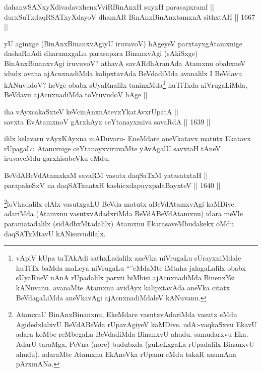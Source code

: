 \begin{shl}
dahanwSANxyXdivadavxhenxVviRBinAnxH suyxH parasapxramf || \\
durxSuTxdaqRSATxyXdayoV dhamAR BinAnxBinAnxtamxnA sithxtAH ||  1667 ||  
\end{shl}


\begin{artha}
yU aginxge (BinAnxBinanxvAgiyU iruvavoV) hAgeyeV parxtayxgAtamxnige dashaRnAdi dharamxgaLu parasapxra BinanxvAgi (sAkiSxge) BinAnxBinanxvAgi iruvuvoV? athavA savARdhAranAda Atamxnu obabxneV idudx avana ajAcnxnadiMda kalipxtavAda BeVdadiMda avanalilx I BeVdavu kANuvudoV? heVge obabx sUyaRnalilx taninxMda\footnote{vApiV kUpa taTAkAdi sathxLadalilx aneVka niVrugaLu sUrayxniMdale huTiTx baMda maLeya niVrugaLu ``\stext''eMdaMte iMtaha jalagaLalilx obabx sUyaRneV nAnA rUpadalilx parxti biMbisi ajAcnxnadiMda BinenxYsi kANuvanu. avanaMte Atamxnu avidAyx kalipxtavAda aneVka citatx BeVdagaLiMda aneVkavAgi ajAcnxnadiMdaleV kANuvanu.} huTiTxda niVrugaLiMda, BeVdavu ajAcnxnadiMda toVruvudoV hAge ||
\end{artha}


\begin{shl}
iha vAyxcakaSxteV keVcinAnxnAtevxYkatAvxrUpatA || \\
savxta EvA\s \s tamxnoV gArxhAyx ceYtanayxmiva savaRdA ||  1639 ||  
\end{shl}

\begin{artha}
ililx kelavaru vAyxKAyxna mADuvaru- EneMdare aneVkatavx matutx Ekatavx rUpagaLu Atamxnige ceYtanayxviruvaMte yAvAgalU savxtaH tAneV iruvaveMdu garxhisabeVku eMdu.
\end{artha}


\begin{shl}
BeVdABeVdAtamxkaM savaRM vasutx daqSaTxM yatasatxtaH ||  \\
parapakeSxV na daqSATxnatxH kashicxdapuyxpalaBayxteV ||  1640 ||  
\end{shl}

\begin{artha}
\footnote{AtamxnU BinAnxBinanxnu, EkeMdare vasutxvAdariMda vasutx eMdu AgidedxlalxvU BeVdABeVda rUpavAgiyeV kaMDive. udA:-vaqkaSxvu EkavU adara koMbe reMbegaLa BeVdadiMda BinanxvU ahudu. samudarxvu Eka. AdarU taraMga, PeVna (nore) budubxda (guLeLxgaLa rUpadalilx BinanxvU ahudu). adaraMte Atamxnu EkAneVka rUpanu eMdu takaR anumAna pArxmANa.}loVkadalilx elAlx vasutxgaLU BeVda matutx aBeVdAtamxvAgi kaMDive. adariMda (Atamxnu vasutxvAdadxriMda BeVdABeVdAtamxnu) idara meVle paramatadalilx (sidAdhxMtadalilx) Atamxnu EkarasaveMbudakekx oMdu daqSATxMtavU kANisuvudilalx.
\end{artha}

